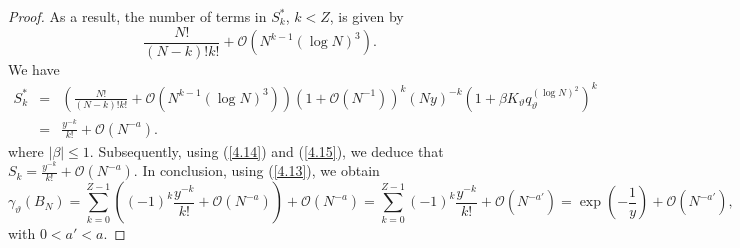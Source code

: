 \documentclass[10pt,a4paper]{amsart}
\begin{document}
\begin{proof}
As a result, the number of terms in $S^*_k$, $k < Z$, is given by  
\[
\frac{N!}{(N-k)!k!} + \mathcal{O}\left( N^{k-1}(\log N)^3\right).
\]
We have
\begin{eqnarray} \label{4.15}
S^*_k &=& \left( \frac{N!}{(N-k)!k!} + \mathcal{O}\left( N^{k-1}(\log N)^3\right) \right) \left( 1+ \mathcal{O}\left( N^{-1}\right)  \right)^k \left(Ny \right)^{-k} \left(1+\beta K_{\vartheta}q^{(\log N)^2}_{\vartheta} \right)^k \nonumber \\
&=& \frac{y^{-k}}{k!} + \mathcal{O}\left( N^{-a} \right).
\end{eqnarray}
where $|\beta| \leq 1$. 
Subsequently, using (\ref{4.14}) and (\ref{4.15}), we deduce that 
$S_k = \frac{y^{-k}}{k!} + \mathcal{O}\left( N^{-a} \right)$. 
In conclusion, using (\ref{4.13}), we obtain
\[
\gamma_{\vartheta} (B_N) = \sum_{k=0}^{Z-1} \left( (-1)^k \frac{y^{-k}}{k!} + \mathcal{O}\left( N^{-a} \right)  \right) + \mathcal{O}\left( N^{-a} \right) = 
\sum_{k=0}^{Z-1} (-1)^k \frac{y^{-k}}{k!} + \mathcal{O}\left( N^{-a'} \right) = \exp\left(-\frac{1}{y} \right) 
+ \mathcal{O}\left( N^{-a'} \right),
\] 
with $0 < a' < a$. 
\end{proof}
\end{document}
